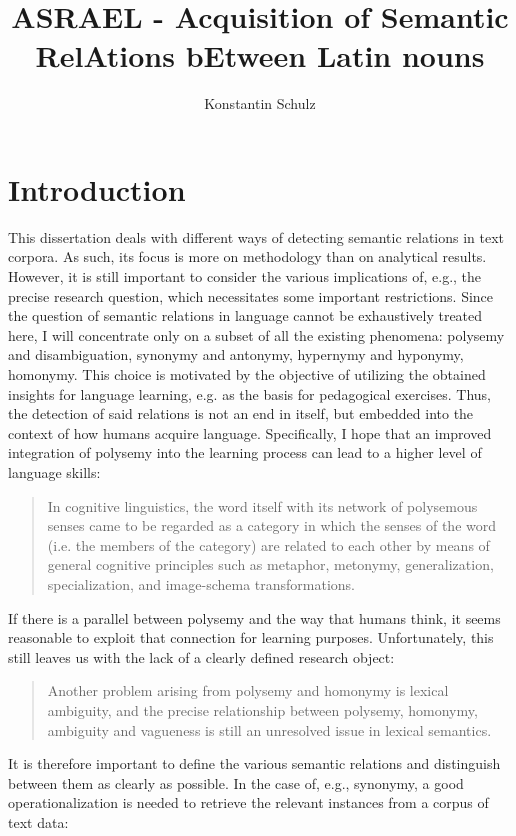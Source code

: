 \documentclass[jou]{apa6} %
\title{ASRAEL - Acquisition of Semantic RelAtions bEtween Latin nouns}
\author{Konstantin Schulz}
\affiliation{Humboldt-Universität zu Berlin}
\begin{document}
\maketitle    
\tableofcontents
                        
\section{Introduction}

This dissertation deals with different ways of detecting semantic relations in text corpora. As such, its focus is more on methodology than on analytical results. However, it is still important to consider the various implications of, e.g., the precise research question, which necessitates some important restrictions. Since the question of semantic relations in language cannot be exhaustively treated here, I will concentrate only on a subset of all the existing phenomena: polysemy and disambiguation, synonymy and antonymy, hypernymy and hyponymy, homonymy. This choice is motivated by the objective of utilizing the obtained insights for language learning, e.g. as the basis for pedagogical exercises. Thus, the detection of said relations is not an end in itself, but embedded into the context of how humans acquire language. 
Specifically, I hope that an improved integration of polysemy into the learning process can lead to a higher level of language skills: 
 \blockquote[{\cite[p.~5]{nerlichPolysemyFlexibilityIntroduction2003}}]{In cognitive linguistics, the word itself with its network of polysemous senses came to be regarded as a category in which the senses of the word (i.e. the members of the category) are related to each other by means of general cognitive principles such as metaphor, metonymy, generalization, specialization, and image-schema transformations.}
If there is a parallel between polysemy and the way that humans think, it seems reasonable to exploit that connection for learning purposes. Unfortunately, this still leaves us with the lack of a clearly defined research object:
\blockquote[{\cite[p.~4]{nerlichPolysemyFlexibilityIntroduction2003}}]{Another problem arising from polysemy and homonymy is lexical ambiguity, and the precise relationship between polysemy, homonymy, ambiguity and vagueness is still an unresolved issue in lexical semantics.}
It is therefore important to define the various semantic relations and distinguish between them as clearly as possible. In the case of, e.g., synonymy, a good operationalization is needed to retrieve the relevant instances from a corpus of text data:
\end{document}
